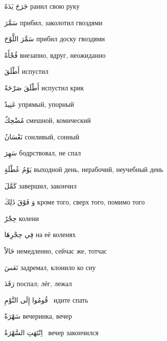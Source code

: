 \documentclass[a5paper]{article}
\newcommand\textstyleDropCaps[1]{#1}
\newcommand\textstyleCaptioncharacters[1]{#1}
\begin{document}
\textstyleCaptioncharacters{جَرَحَ يَدَهُ }\textstyleDropCaps{ранил свою руку‎}

\textstyleCaptioncharacters{سَمَّرَ }\textstyleDropCaps{прибил, заколотил гвоздями‎}

\textstyleCaptioncharacters{سَمَّرَ اللَّوْحَ }\textstyleDropCaps{прибил дос­ку гвоздями‎}

\textstyleCaptioncharacters{فُجْأَةً }\textstyleDropCaps{внезапно, вдруг, неожиданно‎}

\textstyleCaptioncharacters{أَطْلَقَ }\textstyleDropCaps{испустил‎}

\textstyleCaptioncharacters{أَطْلَقَ صَرْحَةً }\textstyleDropCaps{испустил крик‎}

\textstyleCaptioncharacters{عَنِيدٌ }\textstyleDropCaps{упрямый, упорный ‎}

\textstyleCaptioncharacters{مُضْحِكٌ }\textstyleDropCaps{смешной, коми­ческий ‎}

\textstyleCaptioncharacters{نَعْسَانُ }\textstyleDropCaps{сонливый, сон­ный ‎}

\textstyleCaptioncharacters{سَهِرَ }\textstyleDropCaps{бодрствовал, не спал‎}

\textstyleCaptioncharacters{يَوْمُ عُطْلَةٍ }\textstyleDropCaps{выходной день, нерабочий, неучебный день‎}

\textstyleCaptioncharacters{كَمَّلَ }\textstyleDropCaps{завершил, закончил‎}

\textstyleCaptioncharacters{وَ فَوْقَ ذَلِكَ }\textstyleDropCaps{кроме того, сверх того, помимо того‎}

\textstyleCaptioncharacters{حِجْرٌ }\textstyleDropCaps{колени‎}

\textstyleCaptioncharacters{فِي حِجْرِهَا }\textstyleDropCaps{на её коле­нях‎}

\textstyleCaptioncharacters{حَالاً }\textstyleDropCaps{немедленно, сейчас же, тотчас‎}

\textstyleCaptioncharacters{نَعَسَ }\textstyleDropCaps{задремал, клонило ко сну‎}

\textstyleCaptioncharacters{رَقَدَ }\textstyleDropCaps{поспал; лёг, лежал ‎}

\textstyleCaptioncharacters{قُومُوا إِلَى النَّوْمِ \ }\textstyleDropCaps{идите спать‎}

\textstyleCaptioncharacters{سَهْرَةٌ }\textstyleDropCaps{вечеринка, вечер ‎}

\textstyleCaptioncharacters{اِنْتَهَتِ السَّهْرَةُ \ }\textstyleDropCaps{вечер закончился ‎}
\end{document}
